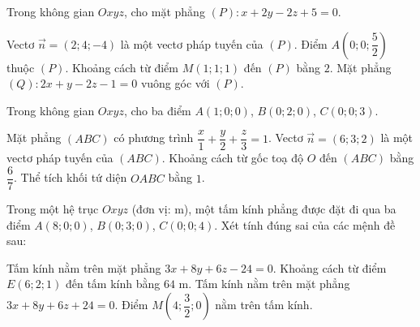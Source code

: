 \begin{bai}Trong không gian $Oxyz$, cho mặt phẳng $(P)\colon x+2y-2z+5=0$.
\begin{dungsai}
  \y Vectơ $\vec n=(2;4;-4)$ là một vectơ pháp tuyến của $(P)$. \oDS
  \y Điểm $A(0;0;\dfrac{5}{2})$ thuộc $(P)$. \oDS
  \y Khoảng cách từ điểm $M(1;1;1)$ đến $(P)$ bằng $2$. \oDS
  \y Mặt phẳng $(Q)\colon 2x+y-2z-1=0$ vuông góc với $(P)$. \oDS
\end{dungsai}
\end{bai}
\begin{bai}Trong không gian $Oxyz$, cho ba điểm $A(1;0;0)$, $B(0;2;0)$, $C(0;0;3)$.
\begin{dungsai}
  \y Mặt phẳng $(ABC)$ có phương trình $\dfrac x1+\dfrac y2+\dfrac z3=1$. \oDS
  \y Vectơ $\vec n=(6;3;2)$ là một vectơ pháp tuyến của $(ABC)$. \oDS
  \y Khoảng cách từ gốc toạ độ $O$ đến $(ABC)$ bằng $\dfrac67$. \oDS
  \y Thể tích khối tứ diện $OABC$ bằng $1$. \oDS
\end{dungsai}
\end{bai}
\begin{bai}Trong một hệ trục $Oxyz$ (đơn vị: m), một tấm kính phẳng được đặt đi qua ba điểm $A(8;0;0)$, $B(0;3;0)$, $C(0;0;4)$. Xét tính đúng sai của các mệnh đề sau:

\begin{dungsai}
  \y Tấm kính nằm trên mặt phẳng $3x+8y+6z-24=0$. \oDS
  \y Khoảng cách từ điểm $E(6;2;1)$ đến tấm kính bằng $64$ m. \oDS
  \y Tấm kính nằm trên mặt phẳng $3x+8y+6z+24=0$. \oDS
  \y Điểm $M(4;\dfrac{3}{2};0)$ nằm trên tấm kính. \oDS
\end{dungsai}
\end{bai}
